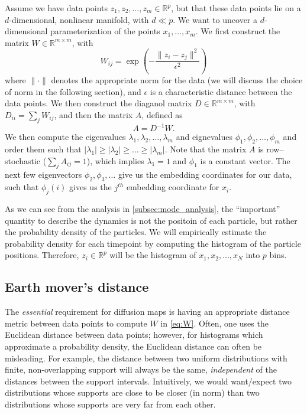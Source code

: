 \documentclass[prl,reprint]{revtex4-1}
\begin{document}
Assume we have data points $z_1, z_2, \dots, z_m \in \mathbb{R}^p$, but that these data points lie on a $d$-dimensional, nonlinear manifold, with $d \ll p$. 
%
We want to uncover a $d$-dimensional parameterization of the points $x_1, \dots, x_m$.
%
We first construct the matrix $W \in \mathbb{R}^{m \times m}$, with
\begin{equation} \label{eq:W}
W_{ij} = \exp \left( -\frac{\|z_i - z_j \|^2}{\epsilon^2} \right)
\end{equation}
where $\| \cdot \|$ denotes the appropriate norm for the data (we will discuss the choice of norm in the following section), and $\epsilon$ is a characteristic distance between the data points.
%
We then construct the diaganol matrix $D \in \mathbb{R}^{m \times m}$, with $D_{ii} = \sum_j W_{ij}$, and then the matrix $A$, defined as
\begin{equation}
A = D^{-1} W.
\end{equation}
%
We then compute the eigenvalues $\lambda_1, \lambda_2, \dots, \lambda_m$ and eignevalues $\phi_1, \phi_2, \dots, \phi_m$ and order them such that $|\lambda_1| \ge |\lambda_2| \ge \dots \ge |\lambda_m|$. 
%
Note that the matrix $A$ is row--stochastic ($\sum_j A_{ij} = 1$), which implies $\lambda_1 = 1$ and $\phi_1$ is a constant vector.
%
The next few eigenvectors $\phi_2, \phi_3, \dots$ give us the embedding coordinates for our data, such that $\phi_j(i)$ gives us the $j^{th}$ embedding coordinate for $x_i$.

As we can see from the analysis in \ref{subsec:mode_analysis}, the ``important'' quantity to describe the dynamics is not the positoin of each particle, but rather the probability density of the particles.
%
We will empirically estimate the probability density for each timepoint by computing the histogram of the particle positions. 
%
Therefore, $z_i \in \mathbb{R}^p$ will be the histogram of $x_1, x_2, \dots, x_N$ into $p$ bins.

\subsection{Earth mover's distance}

The {\em essential} requirement for diffusion maps is having an appropriate distance metric between data points to compute $W$ in \ref{eq:W}.
%
Often, one uses the Euclidean distance between data points;
however, for histograms which approximate a probability density, the Euclidean distance can often be misleading.
%
For example, the distance between two uniform distributions with finite, non-overlapping support will always be the same, {\em independent} of the distances between the support intervals.
%
Intuitively, we would want/expect two distributions whose supports are close to be closer (in norm) than two distributions whose supports are very far from each other.
\end{document}
